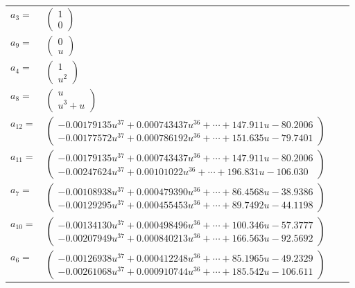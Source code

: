 \documentclass[1p]{elsarticle_modified}
\theoremstyle{definition}
\begin{document}
\begin{tabular}{m{7pt} m{180pt} m{7pt} m{180pt} }
\flushright $a_{3}=$&$\begin{pmatrix}1\\0\end{pmatrix}$ \\
\flushright $a_{9}=$&$\begin{pmatrix}0\\u\end{pmatrix}$ \\
\flushright $a_{4}=$&$\begin{pmatrix}1\\u^2\end{pmatrix}$ \\
\flushright $a_{8}=$&$\begin{pmatrix}u\\u^3+u\end{pmatrix}$ \\
\flushright $a_{12}=$&$\begin{pmatrix}-0.00179135 u^{37}+0.000743437 u^{36}+\cdots+147.911 u-80.2006\\-0.00177572 u^{37}+0.000786192 u^{36}+\cdots+151.635 u-79.7401\end{pmatrix}$ \\
\flushright $a_{11}=$&$\begin{pmatrix}-0.00179135 u^{37}+0.000743437 u^{36}+\cdots+147.911 u-80.2006\\-0.00247624 u^{37}+0.00101022 u^{36}+\cdots+196.831 u-106.030\end{pmatrix}$ \\
\flushright $a_{7}=$&$\begin{pmatrix}-0.00108938 u^{37}+0.000479390 u^{36}+\cdots+86.4568 u-38.9386\\-0.00129295 u^{37}+0.000455453 u^{36}+\cdots+89.7492 u-44.1198\end{pmatrix}$ \\
\flushright $a_{10}=$&$\begin{pmatrix}-0.00134130 u^{37}+0.000498496 u^{36}+\cdots+100.346 u-57.3777\\-0.00207949 u^{37}+0.000840213 u^{36}+\cdots+166.563 u-92.5692\end{pmatrix}$ \\
\flushright $a_{6}=$&$\begin{pmatrix}-0.00126938 u^{37}+0.000412248 u^{36}+\cdots+85.1965 u-49.2329\\-0.00261068 u^{37}+0.000910744 u^{36}+\cdots+185.542 u-106.611\end{pmatrix}$ \\

\end{tabular}
\end{document}
